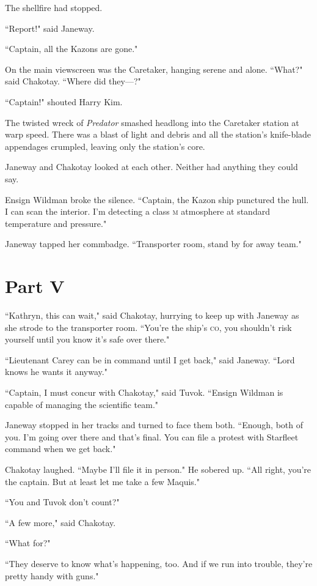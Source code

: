 \documentclass[twoside,letterpaper,12pt]{memoir}
\begin{document}
The shellfire had stopped. 

``Report!" said Janeway. 

``Captain, all the Kazons are gone." 

On the main viewscreen was the Caretaker, hanging serene and alone. ``What?" said Chakotay. ``Where did they---?" 

``Captain!" shouted Harry Kim. 

The twisted wreck of \textit{Predator} smashed headlong into the Caretaker station at warp speed. There was a blast of light and debris and all the station's knife-blade appendages crumpled, leaving only the station's core. 

Janeway and Chakotay looked at each other. Neither had anything they could say. 

Ensign Wildman broke the silence. ``Captain, the Kazon ship punctured the hull. I can scan the interior. I'm detecting a class \textsc{m} atmosphere at standard temperature and pressure." 

Janeway tapped her commbadge. ``Transporter room, stand by for away team."

\chapter*{Part V} 

``Kathryn, this can wait," said Chakotay, hurrying to keep up with Janeway as she strode to the transporter room. ``You're the ship's \textsc{co}, you shouldn't risk yourself until you know it's safe over there." 

``Lieutenant Carey can be in command until I get back," said Janeway. ``Lord knows he wants it anyway." 

``Captain, I must concur with Chakotay," said Tuvok. ``Ensign Wildman is capable of managing the scientific team." 

Janeway stopped in her tracks and turned to face them both. ``Enough, both of you. I'm going over there and that's final. You can file a protest with Starfleet command when we get back." 

Chakotay laughed. ``Maybe I'll file it in person." He sobered up. ``All right, you're the captain. But at least let me take a few Maquis." 

``You and Tuvok don't count?" 

``A few more," said Chakotay. 

``What for?" 

``They deserve to know what's happening, too. And if we run into trouble, they're pretty handy with guns." 
\end{document}
